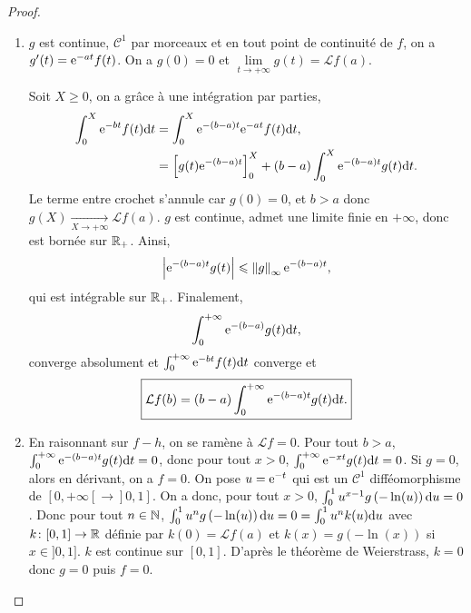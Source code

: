 \begin{proof}
    \phantom{}
    \begin{enumerate}
        \item $g$ est continue, $\mathcal{C}^{1}$ par morceaux et en tout point de continuité de $f$, on a $g'(t)=\mathrm{e}^{-at}f(t)$. On a $g(0)=0$ et $\lim\limits_{t\to+\infty}g(t)=\mathcal{L}f(a)$. 
        
        Soit $X\geqslant0$, on a grâce à une intégration par parties,
        \begin{align}
            \int_{0}^{X}\mathrm{e}^{-bt}f(t)\mathrm{d} t
            &=\int_{0}^{X}\mathrm{e}^{-(b-a)t}\mathrm{e}^{-at}f(t)\mathrm{d} t,\\
            &=\left[g(t)\mathrm{e}^{-(b-a)t}\right]_{0}^{X}+(b-a)\int_{0}^{X}\mathrm{e}^{-(b-a)t}g(t)\mathrm{d} t.
        \end{align}
        Le terme entre crochet s'annule car $g(0)=0$, et $b>a$ donc $g(X)\xrightarrow[X\to+\infty]{}\mathcal{L}f(a)$. $g$ est continue, admet une limite finie en $+\infty$, donc est bornée sur $\mathbb{R}_{+}$. Ainsi,
        \begin{equation}
            \left\lvert\mathrm{e}^{-(b-a)t}g(t)\right\rvert\leqslant\left\lVert g\right\rVert_{\infty}\mathrm{e}^{-(b-a)t},
        \end{equation}
        qui est intégrable sur $\mathbb{R}_{+}$. Finalement, 
        \begin{equation}
            \int_{0}^{+\infty}\mathrm{e}^{-(b-a)}g(t)\mathrm{d} t,    
        \end{equation}
        converge absolument et $\int_{0}^{+\infty}\mathrm{e}^{-bt}f(t)\mathrm{d} t$ converge et 
        \begin{equation}
            \boxed{
                \mathcal{L}f(b)=(b-a)\int_{0}^{+\infty}\mathrm{e}^{-(b-a)t}g(t)\mathrm{d} t.
            }
        \end{equation}

        \item En raisonnant sur $f-h$, on se ramène à $\mathcal{L}f=0$. Pour tout $b>a$, $\int_{0}^{+\infty}\mathrm{e}^{-(b-a)t}g(t)\mathrm{d} t=0$, donc pour tout $x>0$, $\int_{0}^{+\infty}\mathrm{e}^{-xt}g(t)\mathrm{d} t=0$. Si $g=0$, alors en dérivant, on a $f=0$. On pose $u=\mathrm{e}^{-t}$ qui est un $\mathcal{C}^{1}$ difféomorphisme de $[0,+\infty[\to]0,1]$. On a donc, pour tout $x>0$, $\int_{0}^{1}u^{x-1}g\left(-\ln(u)\right)\mathrm{d} u=0$. Donc pour tout $n\in\mathbb{N}$, $\int_{0}^{1}u^{n}g\left(-\ln(u)\right)\mathrm{d} u=0=\int_{0}^{1}u^{n}k(u)\mathrm{d} u$ avec $k\colon[0,1]\to\mathbb{R}$ définie par $k(0)=\mathcal{L}f(a)$ et $k(x)=g\left(-\ln(x)\right)$ si $x\in]0,1]$. $k$ est continue sur $[0,1]$. D'après le théorème de Weierstrass, $k=0$ donc $g=0$ puis $f=0$.
    \end{enumerate}
\end{proof}

